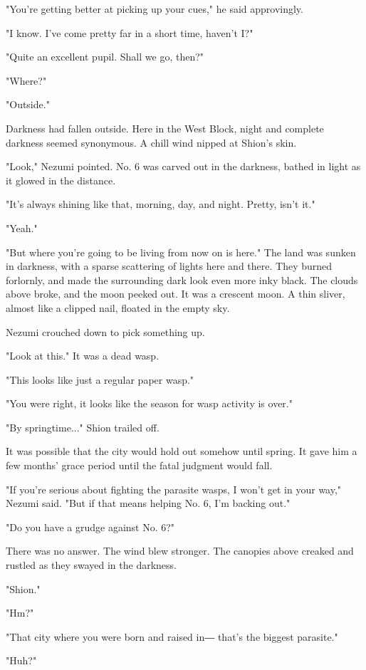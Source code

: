 "You're getting better at picking up your cues," he said approvingly.

"I know. I've come pretty far in a short time, haven't I?"

"Quite an excellent pupil. Shall we go, then?"

"Where?"

"Outside."

Darkness had fallen outside. Here in the West Block, night and complete
darkness seemed synonymous. A chill wind nipped at Shion's skin.

"Look," Nezumi pointed. No. 6 was carved out in the darkness, bathed in
light as it glowed in the distance.

"It's always shining like that, morning, day, and night. Pretty, isn't
it."

"Yeah."

"But where you're going to be living from now on is here." The land was
sunken in darkness, with a sparse scattering of lights here and there.
They burned forlornly, and made the surrounding dark look even more inky
black. The clouds above broke, and the moon peeked out. It was a
crescent moon. A thin sliver, almost like a clipped nail, floated in the
empty sky.

Nezumi crouched down to pick something up.

"Look at this." It was a dead wasp.

"This looks like just a regular paper wasp."

"You were right, it looks like the season for wasp activity is over."

"By springtime..." Shion trailed off.

It was possible that the city would hold out somehow until spring. It
gave him a few months' grace period until the fatal judgment would fall.

"If you're serious about fighting the parasite wasps, I won't get in
your way," Nezumi said. "But if that means helping No. 6, I'm backing
out."

"Do you have a grudge against No. 6?"

There was no answer. The wind blew stronger. The canopies above creaked
and rustled as they swayed in the darkness.

"Shion."

"Hm?"

"That city where you were born and raised in― that's the biggest
parasite."

"Huh?"

